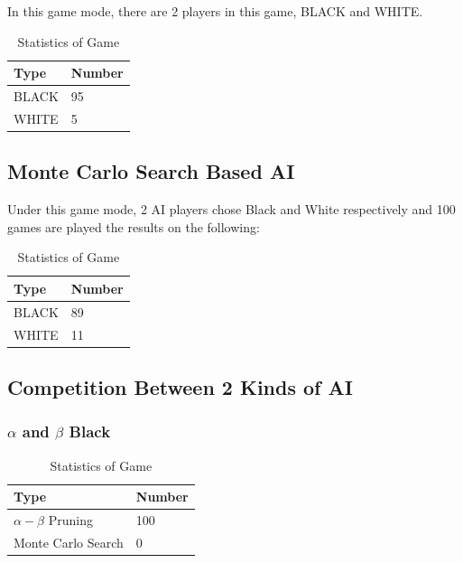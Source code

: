 \documentclass[11pt, a4paper]{article}
\begin{document}
In this game mode, there are 2 players in this game, BLACK and WHITE.

\begin{table}[htbp] 
	\begin{center}
		\caption{Statistics of Game}
		\begin{tabular}{|l|l|} \hline
			Type & Number  \\ \hline
			BLACK &  95      \\ \hline
			WHITE &   5    \\ \hline
		
		\end{tabular}
		
		\label{tab:ab}
	\end{center}
\end{table}

\subsection{Monte Carlo Search Based AI}

Under this game mode, 2 AI players chose Black and White respectively and 100 games are played the results on the following:

\begin{table}[htbp] 
	\begin{center}
		\caption{Statistics of Game}
		\begin{tabular}{|l|l|} \hline
			Type & Number  \\ \hline
			BLACK &  89     \\ \hline
			WHITE &   11    \\ \hline
			
		\end{tabular}
		
		\label{tab:mc}
	\end{center}
\end{table}

\subsection{Competition Between 2 Kinds of AI }

\subsubsection{$\alpha$ and $\beta$ Black}

\begin{table}[htbp] 
	\begin{center}
		\caption{Statistics of Game}
		\begin{tabular}{|l|l|} \hline
			Type & Number  \\ \hline
			$\alpha-\beta$ Pruning  &  100   \\ \hline
			Monte Carlo Search &   0 \\ \hline
			
		\end{tabular}
		
		\label{tab:r-1}
	\end{center}
\end{table}
\end{document}
